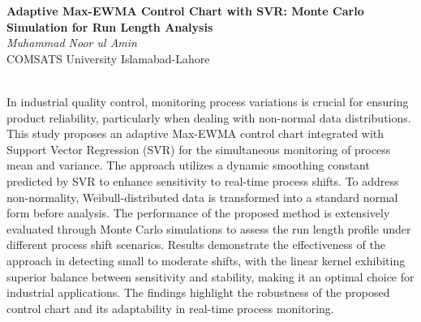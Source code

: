 \documentclass[12pt,a4paper,figuresright]{book}
\newenvironment{talk}[6]%
 {%
  \vskip 0pt\nopagebreak%
 \vskip 0pt\nopagebreak%
  \textbf{#1}\vspace{3mm}\\\nopagebreak%
  \textit{#2}\\\nopagebreak%
  #3\\\nopagebreak%
  \url{#4}\vspace{3mm}\\\nopagebreak%
  \ifthenelse{\equal{#5}{}}{}{Coauthor(s): #5\vspace{3mm}\\\nopagebreak}%
  \ifthenelse{\equal{#6}{}}{}{Special session: #6\quad \vspace{3mm}\\\nopagebreak}%
 }
 {\vspace{1cm}\nopagebreak}%
\begin{document}
	
\begin{talk}
  {Adaptive Max-EWMA Control Chart with SVR: Monte Carlo Simulation for Run Length Analysis}%
  {Muhammad Noor ul Amin}%
  {COMSATS University Islamabad-Lahore}%
  {}%
  {}%
  {}%
			
In industrial quality control, monitoring process variations is crucial for ensuring product
reliability, particularly when dealing with non-normal data distributions. This study proposes an
adaptive Max-EWMA control chart integrated with Support Vector Regression (SVR) for the
simultaneous monitoring of process mean and variance. The approach utilizes a dynamic
smoothing constant predicted by SVR to enhance sensitivity to real-time process shifts. To
address non-normality, Weibull-distributed data is transformed into a standard normal form
before analysis. The performance of the proposed method is extensively evaluated through
Monte Carlo simulations to assess the run length profile under different process shift scenarios.
Results demonstrate the effectiveness of the approach in detecting small to moderate shifts, with
the linear kernel exhibiting superior balance between sensitivity and stability, making it an
optimal choice for industrial applications. The findings highlight the robustness of the proposed
control chart and its adaptability in real-time process monitoring.
\medskip

\end{talk}
\end{document}
